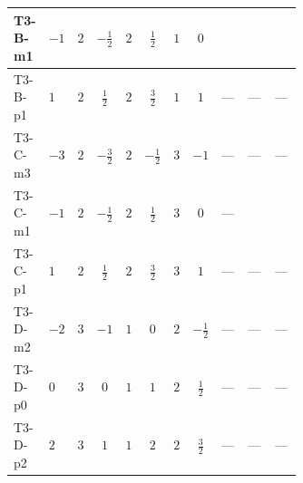 \documentclass[8pt]{article}
\begin{document}
\begin{landscape}
\begin{longtable}{@{}llcccccc >{\raggedright\arraybackslash}p{0.21\linewidth} >{\raggedright\arraybackslash}p{0.21\linewidth} >{\raggedright\arraybackslash}p{0.21\linewidth}@{}}
T3-B-m1 & $-1$ & $2$ & $-\frac{1}{2}$ & $2$ & $\frac{1}{2}$ & $1$ & $0$ & \scriptsize\adjustbox{max width=\linewidth}{$\begin{gathered} {\lambda_{12}^{(1)}} (\operatorname{Tr}\!\left({y_2}\,\left({y_1}\right)^{\dagger}\right)+6 {\lambda_{10}}+6 {\lambda_{11}})\end{gathered}$} & \scriptsize\adjustbox{max width=\linewidth}{$\begin{gathered} +{\lambda_{12}^{(A)}} \left(\frac{1}{12} \operatorname{Tr}\!\left({y_2}\,\left({y_1}\right)^{\dagger}\right)+\frac{5 {\lambda_{10}}}{6}+\frac{{\lambda_{11}}}{6}\right)\end{gathered}$} & \scriptsize\adjustbox{max width=\linewidth}{$\begin{gathered} +{\lambda_{9}} (2 \operatorname{Tr}\!\left({y_1}\,\left({y_2}\right)^{\dagger}\right)+4 (5 \left({\lambda_{10}}\right)^{*}+\left({\lambda_{11}}\right)^{*}))\end{gathered}$} \\
\midrule
T3-B-p1 & $1$ & $2$ & $\frac{1}{2}$ & $2$ & $\frac{3}{2}$ & $1$ & $1$ & --- & --- & --- \\
\midrule
T3-C-m3 & $-3$ & $2$ & $-\frac{3}{2}$ & $2$ & $-\frac{1}{2}$ & $3$ & $-1$ & --- & --- & --- \\
\midrule
T3-C-m1 & $-1$ & $2$ & $-\frac{1}{2}$ & $2$ & $\frac{1}{2}$ & $3$ & $0$ & --- & \scriptsize\adjustbox{max width=\linewidth}{$\begin{gathered} +{\lambda_{12}^{(A)}} \left(\frac{1}{8} \operatorname{Tr}\!\left({y_2}\,\left({y_1}\right)^{\dagger}\right)+\frac{5 {\lambda_{10}}}{6}+\frac{{\lambda_{11}}}{6}\right)\end{gathered}$} & \scriptsize\adjustbox{max width=\linewidth}{$\begin{gathered} +{\lambda_{9}} (3 \operatorname{Tr}\!\left({y_1}\,\left({y_2}\right)^{\dagger}\right)+4 (5 \left({\lambda_{10}}\right)^{*}+\left({\lambda_{11}}\right)^{*}))\end{gathered}$} \\
\midrule
T3-C-p1 & $1$ & $2$ & $\frac{1}{2}$ & $2$ & $\frac{3}{2}$ & $3$ & $1$ & --- & --- & --- \\
\midrule
T3-D-m2 & $-2$ & $3$ & $-1$ & $1$ & $0$ & $2$ & $-\frac{1}{2}$ & --- & --- & --- \\
\midrule
T3-D-p0 & $0$ & $3$ & $0$ & $1$ & $1$ & $2$ & $\frac{1}{2}$ & --- & --- & --- \\
\midrule
T3-D-p2 & $2$ & $3$ & $1$ & $1$ & $2$ & $2$ & $\frac{3}{2}$ & --- & --- & --- \\

\end{longtable}
\end{landscape}
\end{document}
